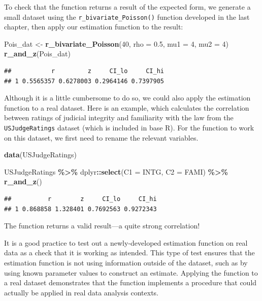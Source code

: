 \documentclass[
]{book}
\newenvironment{Shaded}{\begin{snugshade}}{\end{snugshade}}
\newcommand{\AttributeTok}[1]{\textcolor[rgb]{0.13,0.29,0.53}{#1}}
\newcommand{\DecValTok}[1]{\textcolor[rgb]{0.00,0.00,0.81}{#1}}
\newcommand{\FloatTok}[1]{\textcolor[rgb]{0.00,0.00,0.81}{#1}}
\newcommand{\FunctionTok}[1]{\textcolor[rgb]{0.13,0.29,0.53}{\textbf{#1}}}
\newcommand{\NormalTok}[1]{#1}
\newcommand{\OtherTok}[1]{\textcolor[rgb]{0.56,0.35,0.01}{#1}}
\newcommand{\SpecialCharTok}[1]{\textcolor[rgb]{0.81,0.36,0.00}{\textbf{#1}}}
\begin{document}
To check that the function returns a result of the expected form, we generate a small dataset using the \texttt{r\_bivariate\_Poisson()} function developed in the last chapter, then apply our estimation function to the result:

\begin{Shaded}
\begin{Highlighting}[]
\NormalTok{Pois\_dat }\OtherTok{\textless{}{-}} \FunctionTok{r\_bivariate\_Poisson}\NormalTok{(}\DecValTok{40}\NormalTok{, }\AttributeTok{rho =} \FloatTok{0.5}\NormalTok{, }\AttributeTok{mu1 =} \DecValTok{4}\NormalTok{, }\AttributeTok{mu2 =} \DecValTok{4}\NormalTok{)}
\FunctionTok{r\_and\_z}\NormalTok{(Pois\_dat)}
\end{Highlighting}
\end{Shaded}

\begin{verbatim}
##           r         z     CI_lo     CI_hi
## 1 0.5565357 0.6278003 0.2964146 0.7397905
\end{verbatim}

Although it is a little cumbersome to do so, we could also apply the estimation function to a real dataset.
Here is an example, which calculates the correlation between ratings of judicial integrity and familiarity with the law from the \texttt{USJudgeRatings} dataset (which is included in base R).
For the function to work on this dataset, we first need to rename the relevant variables.

\begin{Shaded}
\begin{Highlighting}[]
\FunctionTok{data}\NormalTok{(USJudgeRatings)}

\NormalTok{USJudgeRatings }\SpecialCharTok{\%\textgreater{}\%}
\NormalTok{  dplyr}\SpecialCharTok{::}\FunctionTok{select}\NormalTok{(}\AttributeTok{C1 =}\NormalTok{ INTG, }\AttributeTok{C2 =}\NormalTok{ FAMI) }\SpecialCharTok{\%\textgreater{}\%}
  \FunctionTok{r\_and\_z}\NormalTok{()}
\end{Highlighting}
\end{Shaded}

\begin{verbatim}
##          r        z     CI_lo     CI_hi
## 1 0.868858 1.328401 0.7692563 0.9272343
\end{verbatim}

The function returns a valid result---a quite strong correlation!

It is a good practice to test out a newly-developed estimation function on real data as a check that it is working as intended.
This type of test ensures that the estimation function is not using information outside of the dataset, such as by using known parameter values to construct an estimate.
Applying the function to a real dataset demonstrates that the function implements a procedure that could actually be applied in real data analysis contexts.
\end{document}
